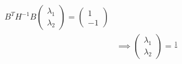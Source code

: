 \documentclass[11pt]{article}
\theoremstyle{definition}
\theoremstyle{remark}
\numberwithin{equation}{section}
\begin{document}
\begin{align*}
B^T H^{-1} B \begin{pmatrix}\lambda_1 \\ \lambda_2 \end{pmatrix} = \begin{pmatrix} 1 \\ -1 \end{pmatrix}\\
&\implies \begin{pmatrix} \lambda_1 \\ \lambda_2 \end{pmatrix} = \frac{1}{}
\end{align*}
\end{document}
